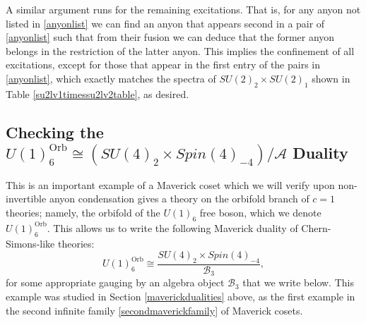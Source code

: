 \documentclass[11pt]{article}
\numberwithin{equation}{section}
\begin{document}
A similar argument runs for the remaining excitations. That is, for any anyon not listed in \eqref{anyonlist} we can find an anyon that appears second in a pair of \eqref{anyonlist} such that from their fusion we can deduce that the former anyon belongs in the restriction of the latter anyon. This implies the confinement of all excitations, except for those that appear in the first entry of the pairs in \eqref{anyonlist}, which exactly matches the spectra of $SU(2)_{2} \times SU(2)_{1}$ shown in Table \ref{su2lv1timessu2lv2table}, as desired.

\subsection{Checking the $U(1)^{\mathrm{Orb}}_{6} \cong (SU(4)_{2} \times Spin(4)_{-4})/\mathcal{A}$ Duality} \label{orbifoldexample}

This is an important example of a Maverick coset which we will verify upon non-invertible anyon condensation gives a theory on the orbifold branch of $c=1$ theories; namely, the orbifold of the $U(1)_{6}$ free boson, which we denote $U(1)^{\mathrm{Orb}}_{6}$. This allows us to write the following Maverick duality of Chern-Simons-like theories:
\begin{equation}
    U(1)^{\mathrm{Orb}}_{6} \cong \frac{SU(4)_{2} \times Spin(4)_{-4}}{\mathcal{B}_{3}},
\end{equation}
for some appropriate gauging by an algebra object $\mathcal{B}_{3}$ that we write below. This example was studied in Section \ref{maverickdualities} above, as the first example in the second infinite family \eqref{secondmaverickfamily} of Maverick cosets.
\end{document}
